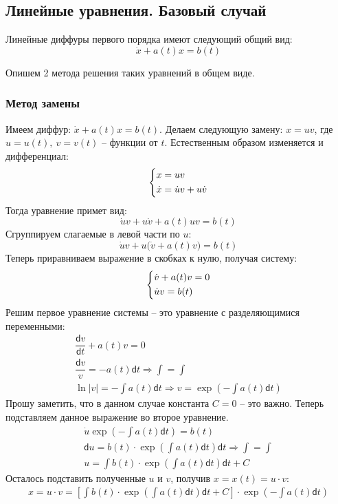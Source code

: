 \documentclass[a4paper,12pt]{article}
\renewcommand{\d}{\mathsf{d}}
\newcommand{\du}{\dot{u}}
\renewcommand{\dv}{\dot{v}}
\newcommand{\dx}{\dot{x}}
\newcommand{\ds}{\displaystyle}
\begin{document}
\subsection{Линейные уравнения. Базовый случай}

Линейные диффуры первого порядка имеют следующий общий вид: \[\dx + a(t)x = b(t)\]

Опишем 2 метода решения таких уравнений в общем виде.

\subsubsection{Метод замены}

Имеем диффур: $\dx + a(t)x = b(t)$. Делаем следующую замену: $x = uv$, где $u = u(t),\ v = v(t)$ -- функции от $t$. Естественным образом изменяется и дифференциал:
\[\left\{\begin{gathered}
x = uv\hfill\\
\dx = \du v + u\dv\hfill
\end{gathered}\right.\]
Тогда уравнение примет вид:
\[\du v + u\dv + a(t)uv = b(t)\]
Сгруппируем слагаемые в левой части по $u$:
\[\du v + u\big(\dv + a(t)v\big) = b(t)\]
Теперь приравниваем выражение в скобках к нулю, получая систему:
\[\left\{\begin{gathered}
\dv + a(t)v = 0\hfill\\
\du v = b(t)\hfill
\end{gathered}\right.\]
Решим первое уравнение системы -- это уравнение с разделяющимися переменными:
\begin{gather*}
\dfrac{\d v}{\d t} + a(t)v = 0\\
\dfrac{\d v}{v} = -a(t)\d t \Longrightarrow \ds\int = \int\\
\ln|v| = -\ds\int a(t) \d t \Longrightarrow v = \exp(-\ds\int a(t)\d t)
\end{gather*}
Прошу заметить, что в данном случае константа $C = 0$ -- это важно. Теперь подставляем данное выражение во второе уравнение.
\begin{gather*}
\du\exp(-\ds\int a(t)\d t) = b(t)\\
\d u = b(t) \cdot \exp(\ds\int a(t)\d t)\d t \Longrightarrow \ds\int = \int\\
u = \ds\int b(t) \cdot \exp(\ds\int a(t) \d t)\d t + C
\end{gather*}
Осталось подставить полученные $u$ и $v$, получив $x = x(t) = u \cdot v$:
\begin{gather*}
x = u \cdot v = \left[\ds\int b(t) \cdot \exp(\ds\int a(t) \d t)\d t + C\right] \cdot \exp(-\ds\int a(t) \d t)
\end{gather*}
\ \\
\end{document}
